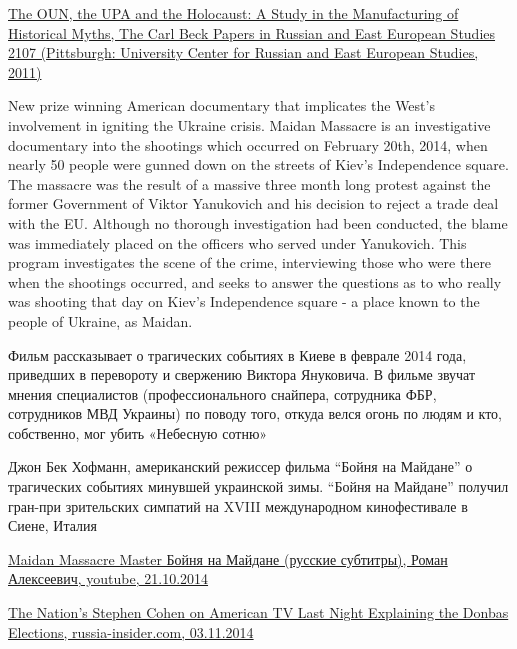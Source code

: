 \begin{itemize}
\href{https://www.academia.edu/1122859/The_OUN_the_UPA_and_the_Holocaust_A_Study_in_the_Manufacturing_of_Historical_Myths_The_Carl_Beck_Papers_in_Russian_and_East_European_Studies_2107_Pittsburgh_University_Center_for_Russian_and_East_European_Studies_2011_}{%
The OUN, the UPA and the Holocaust: A Study in the Manufacturing of Historical Myths, The Carl Beck Papers in Russian and East European Studies 2107 (Pittsburgh: University Center for Russian and East European Studies, 2011)
}


New prize winning American documentary that implicates the West's involvement
in igniting the Ukraine crisis. Maidan Massacre is an investigative documentary
into the shootings which occurred on February 20th, 2014, when nearly 50 people
were gunned down on the streets of Kiev's Independence square.  The massacre
was the result of a massive three month long protest against the former
Government of Viktor Yanukovich and his decision to reject a trade deal with
the EU. Although no thorough investigation had been conducted, the blame was
immediately placed on the officers who served under Yanukovich. This program
investigates the scene of the crime, interviewing those who were there when the
shootings occurred, and seeks to answer the questions as to who really was
shooting that day on Kiev's Independence square - a place known to the people
of Ukraine, as Maidan.

Фильм рассказывает о трагических событиях в Киеве в феврале 2014 года,
приведших в перевороту и свержению Виктора Януковича. В фильме звучат мнения
специалистов (профессионального снайпера, сотрудника ФБР, сотрудников МВД
Украины) по поводу того, откуда велся огонь по людям и кто, собственно, мог
убить «Небесную сотню»

Джон Бек Хофманн, американский режиссер фильма \enquote{Бойня на Майдане} о
трагических событиях минувшей украинской зимы. \enquote{Бойня на Майдане}
получил гран-при зрительских симпатий на XVIII международном кинофестивале в
Сиене, Италия

\href{https://www.youtube.com/watch?v=zV-TZQKgAPE}{%
Maidan Massacre Master Бойня на Майдане (русские субтитры), %
Роман Алексеевич, youtube, 21.10.2014%
}


\href{https://russia-insider.com/en/tv_politics_ukraine/2014/11/07/01-12-12pm/nations_stephen_cohen_american_tv_last_night_explaining}{%
The Nation's Stephen Cohen on American TV Last Night Explaining the Donbas Elections, russia-insider.com, 03.11.2014%
}


\end{itemize}
